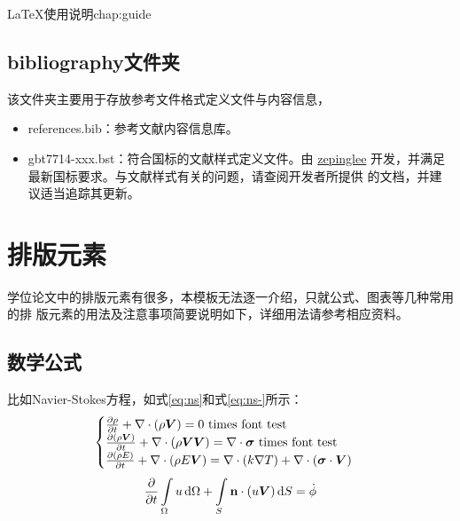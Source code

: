 \begin{cuzchapter}{\LaTeX{}使用说明}{chap:guide}
	\subsection{bibliography文件夹}\label{sub:bibliography}

	该文件夹主要用于存放参考文件格式定义文件与内容信息，

	\begin{itemize}
		\item references.bib：参考文献内容信息库。
		\item gbt7714-xxx.bst：符合国标的文献样式定义文件。由
		      \href{https://github.com/zepinglee/gbt7714-bibtex-style}{zepinglee}
		      开发，并满足最新国标要求。与文献样式有关的问题，请查阅开发者所提供
		      的文档，并建议适当追踪其更新。
	\end{itemize}

	\section{排版元素}\label{sec:elements}

	学位论文中的排版元素有很多，本模板无法逐一介绍，只就公式、图表等几种常用的排
	版元素的用法及注意事项简要说明如下，详细用法请参考相应资料。

	\subsection{数学公式}\label{sub:equations}

	比如Navier-Stokes方程，如式\eqref{eq:ns}和式\eqref{eq:ns-}所示：
	\begin{equation}
		\label{eq:ns}
		\begin{cases}
			\frac{\partial \rho}{\partial t} + \nabla\cdot(\rho\Vector{V}) = 0 \ \mathrm{times\ font\ test}                                            \\
			\frac{\partial (\rho\Vector{V})}{\partial t} + \nabla\cdot(\rho\Vector{V}\Vector{V}) = \nabla\cdot\Tensor{\sigma} \ \text{times font test} \\
			\frac{\partial (\rho E)}{\partial t} + \nabla\cdot(\rho E\Vector{V}) = \nabla\cdot(k\nabla T) + \nabla\cdot(\Tensor{\sigma}\cdot\Vector{V})
		\end{cases}
	\end{equation}
	\begin{equation}
		\label{eq:ns-}
		\frac{\partial }{\partial t}\int\limits_{\Omega} u \, \mathrm{d}\Omega + \int\limits_{S} \boldsymbol{\mathbf{n}}\cdot(u\boldsymbol{V}) \, \mathrm{d}S = \dot{\phi}
	\end{equation}


\end{cuzchapter}
